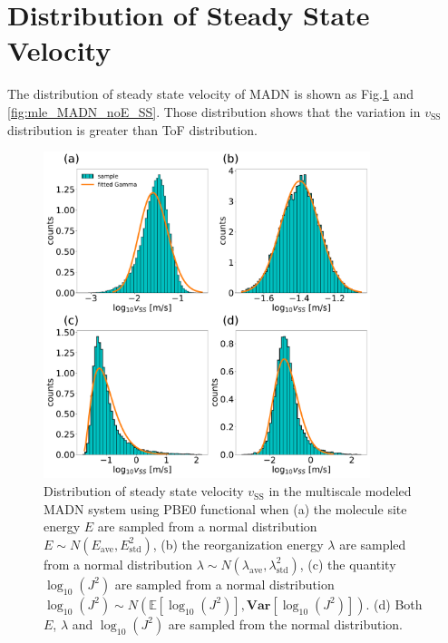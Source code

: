 \documentclass[letterpaper,12pt]{article}
\begin{document}
\section{Distribution of Steady State Velocity}
The distribution of steady state velocity of MADN is shown as Fig.\ref{fig:mle_MADN_withE_SS} and \ref{fig:mle_MADN_noE_SS}. 
Those distribution shows that the variation in $v_\text{SS}$ distribution is greater than ToF distribution. 

\begin{figure}[H]
    \centering
    \includegraphics[width=0.85\textwidth]{figs/MADN_HFX/fig_mle_MADN_withE_SS.pdf}
    \caption{Distribution of steady state velocity $v_\text{SS}$ in the multiscale modeled MADN system using PBE0 functional when (a) the molecule site energy $E$ are sampled from a normal distribution $E \sim N(E_\text{ave},E^2_\text{std})$, (b) the reorganization energy $\lambda$ are sampled from a normal distribution $\lambda \sim N(\lambda_\text{ave},\lambda^2_\text{std})$, (c) the quantity $\log_{10}(J^2)$ are sampled from a normal distribution $\log_{10}(J^2) \sim N(\mathbb{E}[\log_{10}(J^2)], \textbf{Var}[\log_{10}(J^2)] )$. (d) Both $E$, $\lambda$ and $\log_{10}(J^2)$ are sampled from the normal distribution. }
    \label{fig:mle_MADN_withE_SS}
\end{figure}
\end{document}
